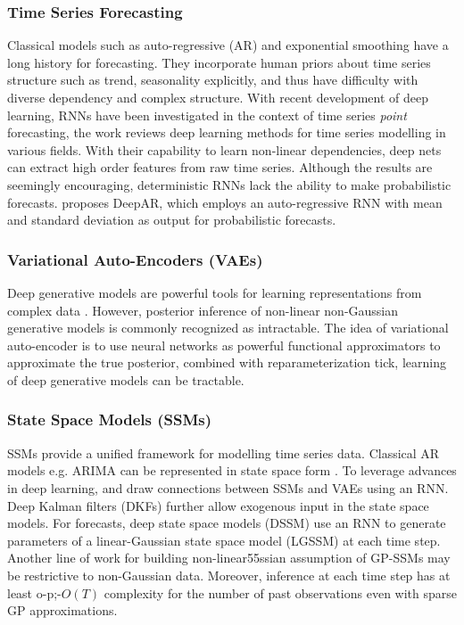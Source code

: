 \documentclass{article}
\begin{document}
\subsubsection{Time Series Forecasting} Classical models such as auto-regressive (AR) and exponential smoothing \cite{brockwell2002introduction} have a long history for forecasting. They incorporate human priors about time series structure such as trend, seasonality explicitly, and thus have difficulty with diverse dependency and complex structure. With recent development of deep learning, RNNs have been investigated in the context of time series \textit{point} forecasting, the work \cite{langkvist2014review} reviews deep learning methods for time series modelling in various fields. With their capability to learn non-linear dependencies, deep nets can extract high order features from raw time series. Although the results are seemingly encouraging, deterministic RNNs lack the ability to make probabilistic forecasts. \cite{flunkert2017deepar} proposes DeepAR, which employs an auto-regressive RNN with mean and standard deviation as output for probabilistic forecasts.

\subsubsection{Variational Auto-Encoders (VAEs)} Deep generative models are powerful tools for learning representations from complex data \cite{bengio2013representation}. However, posterior inference of non-linear non-Gaussian generative models is commonly recognized as intractable. The idea of variational auto-encoder \cite{kingma2013auto} is to use neural networks as powerful functional approximators to approximate the true posterior, combined with reparameterization tick, learning of deep generative models can be tractable.

\subsubsection{State Space Models (SSMs)} SSMs provide a unified framework for modelling time series data. Classical AR models e.g. ARIMA can be represented in state space form \cite{durbin2012time}. To leverage advances in deep learning, \cite{chung2015recurrent} and \cite{fraccaro2016sequential} draw connections between SSMs and VAEs using an RNN. Deep Kalman filters (DKFs) \cite{krishnan2015deep,krishnan2017structured} further allow exogenous input in the state space models. For forecasts, deep state space models (DSSM) \cite{rangapuram2018deep} use an RNN to generate parameters of a linear-Gaussian state space model (LGSSM) at each time step. Another line of work for building non-linear55ssian assumption of GP-SSMs may be restrictive to non-Gaussian data. Moreover, inference at each time step has at least  o-p;-$O(T)$ complexity for the number of past observations even with sparse GP approximations.
\end{document}
